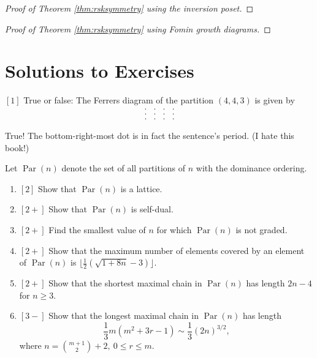 \documentclass{article}
\DeclareMathOperator{\Par}{Par}
\begin{document}
\begin{proof}[Proof of Theorem \ref{thm:rsksymmetry} using the inversion poset]

\end{proof}

\begin{proof}[Proof of Theorem \ref{thm:rsksymmetry} using Fomin growth diagrams]
\end{proof}

\section{Solutions to Exercises}

\begin{exercise}
    $[1]$
    True or false: The Ferrers diagram of the partition $(4,4,3)$ is given by
    \[
        \begin{matrix}
            . & . & . & . \\
            . & . & . & . \\
            . & . & . & .
        \end{matrix}
    \]
\end{exercise}

True! The bottom-right-most dot is in fact the sentence's period. (I hate this book!)

\begin{exercise}
    Let $\Par(n)$ denote the set of all partitions of $n$ with the dominance ordering.
    \begin{enumerate}[label=(\alph*)]
        \item $[2]$ Show that $\Par(n)$ is a lattice.
        \item $[2+]$ Show that $\Par(n)$ is self-dual.
        \item $[2+]$ Find the smallest value of $n$ for which $\Par(n)$ is not graded.
        \item $[2+]$ Show that the maximum number of elements covered by an element of $\Par(n)$ is $\lfloor \frac{1}{2}(\sqrt{1+8n}-3)\rfloor$.
        \item $[2+]$ Show that the shortest maximal chain in $\Par(n)$ has length $2n-4$ for $n \geq 3$.
        \item $[3-]$ Show that the longest maximal chain in $\Par(n)$ has length
            \[
                \frac{1}{3}m(m^2+3r-1) \sim \frac{1}{3}(2n)^{3/2},
            \]
            where $n = \binom{m+1}{2} + 2,\:0 \leq r \leq m$.
    \end{enumerate}
\end{exercise}
\end{document}
